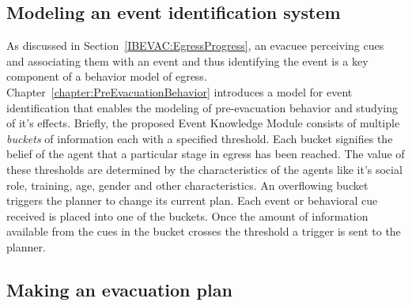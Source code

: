 
\subsection{Modeling an event identification system}
\label{IBEVAC:EventKnowledgeModule}



As discussed in Section~\ref{IBEVAC:EgressProgress}, an evacuee perceiving cues and associating them with an event and thus identifying the event is a key component of a behavior model of egress.
Chapter~\ref{chapter:PreEvacuationBehavior} introduces a model for event identification that enables the modeling of pre-evacuation behavior and studying of it's effects. Briefly, the proposed Event Knowledge Module consists of multiple \emph{buckets} of information each with a specified threshold. Each bucket signifies the belief of the agent that a particular stage in egress has been reached. The value of these thresholds are determined by the characteristics of the agents like it's social role, training, age, gender and other characteristics. An overflowing bucket triggers the planner to change its current plan. Each event or behavioral cue received is placed into one of the buckets. Once the amount of information available from the cues in the bucket crosses the threshold a trigger is sent to the planner.


\subsection{Making an evacuation plan}
\label{IBEVAC:EnvironmentKnowledgeModule}





